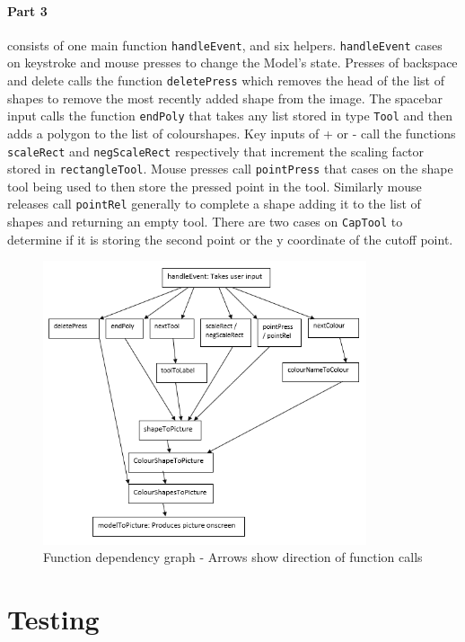 \documentclass[11pt]{article}
\begin{document}
\paragraph{Part 3} consists of one main function  \verb|handleEvent|, and six helpers. \verb|handleEvent| cases on keystroke and mouse presses to change the Model's state. Presses of backspace and delete calls the function \verb|deletePress| which removes the head of the list of shapes to remove the most recently added shape from the image. The spacebar input calls the function \verb|endPoly| that takes any list stored in type \verb|Tool| and then adds a polygon to the list of colourshapes. Key inputs of + or - call the functions \verb|scaleRect| and \verb|negScaleRect| respectively that increment the scaling factor stored in \verb|rectangleTool|. Mouse presses call \verb|pointPress| that cases on the shape tool being used to then store the pressed point in the tool. Similarly mouse releases call \verb|pointRel| generally to complete a shape adding it to the list of shapes and returning an empty tool. There are two cases on \verb|CapTool| to determine if it is storing the second point or the y coordinate of the cutoff point.
\begin{figure}[H]
\centering
\includegraphics[width=0.85\textwidth]{program.png}
\caption{Function dependency graph - Arrows show direction of function calls}
\end{figure}


\section{Testing}%
\end{document}
